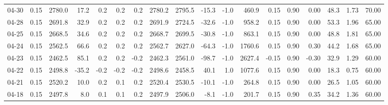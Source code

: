 \begin{threeparttable}
{\begin{tabular}{lrrrrrrrrrrrrrrrrr}
  04-30 &     0.15 & 2780.0 &              17.2 &               0.2 &                0.2 &                0.2 & 2780.2 & 2795.5 &      -15.3 &                     -1.0 &               460.9 &       0.15 &      0.90 &           0.00 &             48.3 &            1.73 &                  70.00 \\
  04-28 &     0.15 & 2691.8 &              32.9 &               0.2 &                0.2 &                0.2 & 2691.9 & 2724.5 &      -32.6 &                     -1.0 &               958.2 &       0.15 &      0.90 &           0.00 &             53.3 &            1.96 &                  65.00 \\
  04-25 &     0.15 & 2668.5 &              34.6 &               0.2 &                0.2 &                0.2 & 2668.7 & 2699.5 &      -30.8 &                     -1.0 &               863.1 &       0.15 &      0.90 &           0.00 &             48.8 &            1.81 &                  65.00 \\
  04-24 &     0.15 & 2562.5 &              66.6 &               0.2 &                0.2 &                0.2 & 2562.7 & 2627.0 &      -64.3 &                     -1.0 &              1760.6 &       0.15 &      0.90 &           0.30 &             44.2 &            1.68 &                  65.00 \\
  04-23 &     0.15 & 2462.5 &              85.1 &               0.2 &                0.2 &               -0.2 & 2462.3 & 2561.0 &      -98.7 &                     -1.0 &              2627.4 &      -0.15 &      0.90 &          -0.30 &             32.9 &            1.29 &                  60.00 \\
  04-22 &     0.15 & 2498.8 &             -35.2 &              -0.2 &               -0.2 &               -0.2 & 2498.6 & 2458.5 &       40.1 &                      1.0 &              1077.6 &       0.15 &      0.90 &           0.00 &             18.3 &            0.75 &                  60.00 \\
  04-21 &     0.15 & 2520.2 &              10.0 &               0.2 &                0.1 &                0.2 & 2520.4 & 2530.5 &      -10.1 &                     -1.0 &               264.8 &       0.15 &      0.90 &           0.00 &             26.5 &            1.05 &                  60.00 \\
  04-18 &     0.15 & 2497.8 &               8.0 &               0.1 &                0.1 &                0.2 & 2497.9 & 2506.0 &       -8.1 &                     -1.0 &               201.7 &       0.15 &      0.90 &           0.35 &             34.2 &            1.36 &                  60.00 \\

\end{tabular}}
\end{threeparttable}
